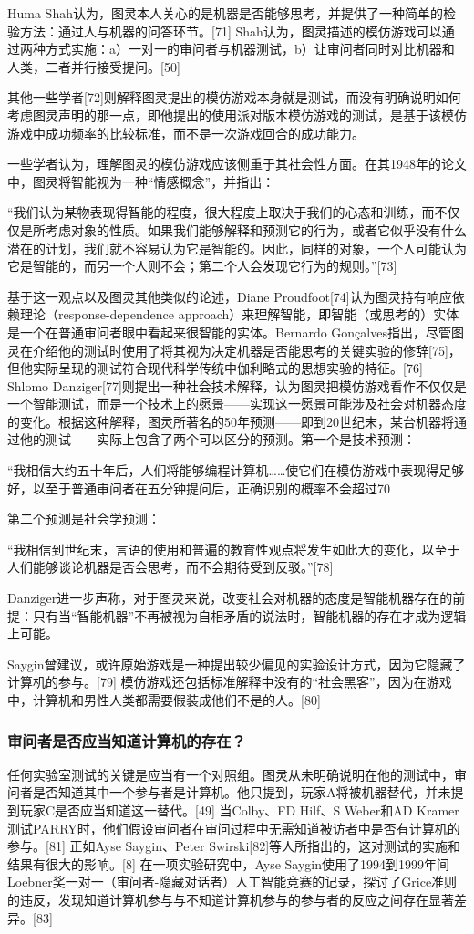 Huma Shah认为，图灵本人关心的是机器是否能够思考，并提供了一种简单的检验方法：通过人与机器的问答环节。[71] Shah认为，图灵描述的模仿游戏可以通过两种方式实施：a）一对一的审问者与机器测试，b）让审问者同时对比机器和人类，二者并行接受提问。[50]

其他一些学者[72]则解释图灵提出的模仿游戏本身就是测试，而没有明确说明如何考虑图灵声明的那一点，即他提出的使用派对版本模仿游戏的测试，是基于该模仿游戏中成功频率的比较标准，而不是一次游戏回合的成功能力。

一些学者认为，理解图灵的模仿游戏应该侧重于其社会性方面。在其1948年的论文中，图灵将智能视为一种“情感概念”，并指出：

“我们认为某物表现得智能的程度，很大程度上取决于我们的心态和训练，而不仅仅是所考虑对象的性质。如果我们能够解释和预测它的行为，或者它似乎没有什么潜在的计划，我们就不容易认为它是智能的。因此，同样的对象，一个人可能认为它是智能的，而另一个人则不会；第二个人会发现它行为的规则。”[73]

基于这一观点以及图灵其他类似的论述，Diane Proudfoot[74]认为图灵持有响应依赖理论（response-dependence approach）来理解智能，即智能（或思考的）实体是一个在普通审问者眼中看起来很智能的实体。Bernardo Gonçalves指出，尽管图灵在介绍他的测试时使用了将其视为决定机器是否能思考的关键实验的修辞[75]，但他实际呈现的测试符合现代科学传统中伽利略式的思想实验的特征。[76] Shlomo Danziger[77]则提出一种社会技术解释，认为图灵把模仿游戏看作不仅仅是一个智能测试，而是一个技术上的愿景——实现这一愿景可能涉及社会对机器态度的变化。根据这种解释，图灵所著名的50年预测——即到20世纪末，某台机器将通过他的测试——实际上包含了两个可以区分的预测。第一个是技术预测：

“我相信大约五十年后，人们将能够编程计算机……使它们在模仿游戏中表现得足够好，以至于普通审问者在五分钟提问后，正确识别的概率不会超过70%

第二个预测是社会学预测：

“我相信到世纪末，言语的使用和普遍的教育性观点将发生如此大的变化，以至于人们能够谈论机器是否会思考，而不会期待受到反驳。”[78]

Danziger进一步声称，对于图灵来说，改变社会对机器的态度是智能机器存在的前提：只有当“智能机器”不再被视为自相矛盾的说法时，智能机器的存在才成为逻辑上可能。

Saygin曾建议，或许原始游戏是一种提出较少偏见的实验设计方式，因为它隐藏了计算机的参与。[79] 模仿游戏还包括标准解释中没有的“社会黑客”，因为在游戏中，计算机和男性人类都需要假装成他们不是的人。[80]
\subsubsection{审问者是否应当知道计算机的存在？}
任何实验室测试的关键是应当有一个对照组。图灵从未明确说明在他的测试中，审问者是否知道其中一个参与者是计算机。他只提到，玩家A将被机器替代，并未提到玩家C是否应当知道这一替代。[49] 当Colby、FD Hilf、S Weber和AD Kramer测试PARRY时，他们假设审问者在审问过程中无需知道被访者中是否有计算机的参与。[81] 正如Ayse Saygin、Peter Swirski[82]等人所指出的，这对测试的实施和结果有很大的影响。[8] 在一项实验研究中，Ayse Saygin使用了1994到1999年间Loebner奖一对一（审问者-隐藏对话者）人工智能竞赛的记录，探讨了Grice准则的违反，发现知道计算机参与与不知道计算机参与的参与者的反应之间存在显著差异。[83]

